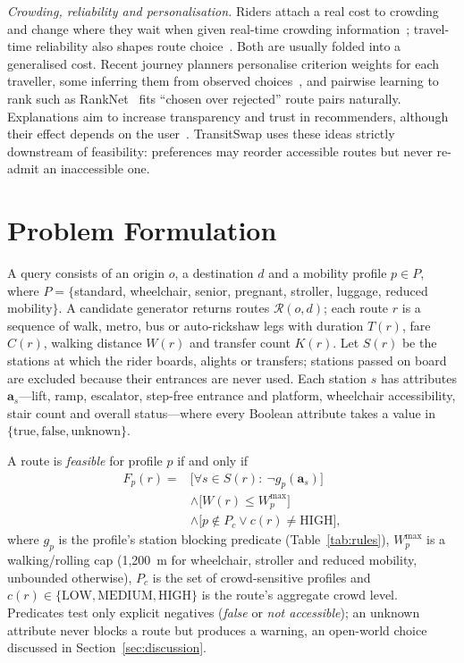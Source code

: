 \documentclass[conference]{IEEEtran}
\begin{document}
\textit{Crowding, reliability and personalisation.} Riders attach a real cost to crowding~\cite{fedujwar2024crowding} and change where they wait when given real-time crowding information~\cite{leprevost2026crowding}; travel-time reliability also shapes route choice~\cite{zhu2025reliability}. Both are usually folded into a generalised cost. Recent journey planners personalise criterion weights for each traveller, some inferring them from observed choices~\cite{bayliss2025maas,mandzuka2026preference}, and pairwise learning to rank such as RankNet~\cite{koppel2025ranknet} fits ``chosen over rejected'' route pairs naturally. Explanations aim to increase transparency and trust in recommenders, although their effect depends on the user~\cite{wardatzky2025explanations}. TransitSwap uses these ideas strictly downstream of feasibility: preferences may reorder accessible routes but never re-admit an inaccessible one.

\section{Problem Formulation}\label{sec:problem}

A query consists of an origin $o$, a destination $d$ and a mobility profile $p \in P$, where $P = \{$standard, wheelchair, senior, pregnant, stroller, luggage, reduced mobility$\}$. A candidate generator returns routes $\mathcal{R}(o,d)$; each route $r$ is a sequence of walk, metro, bus or auto-rickshaw legs with duration $T(r)$, fare $C(r)$, walking distance $W(r)$ and transfer count $K(r)$. Let $S(r)$ be the stations at which the rider boards, alights or transfers; stations passed on board are excluded because their entrances are never used. Each station $s$ has attributes $\mathbf{a}_s$---lift, ramp, escalator, step-free entrance and platform, wheelchair accessibility, stair count and overall status---where every Boolean attribute takes a value in $\{\mathrm{true}, \mathrm{false}, \mathrm{unknown}\}$.

A route is \emph{feasible} for profile $p$ if and only if
\begin{equation}
\begin{split}
F_p(r) = {} & \bigl[\forall s \in S(r){:}\ \neg g_p(\mathbf{a}_s)\bigr] \\
& \wedge \bigl[W(r) \le W^{\max}_{p}\bigr] \\
& \wedge \bigl[p \notin P_c \vee c(r) \ne \mathrm{HIGH}\bigr],
\end{split}
\label{eq:feasible}
\end{equation}
where $g_p$ is the profile's station blocking predicate (Table~\ref{tab:rules}), $W^{\max}_{p}$ is a walking/rolling cap (1,200~m for wheelchair, stroller and reduced mobility, unbounded otherwise), $P_c$ is the set of crowd-sensitive profiles and $c(r) \in \{\mathrm{LOW}, \mathrm{MEDIUM}, \mathrm{HIGH}\}$ is the route's aggregate crowd level. Predicates test only explicit negatives (\emph{false} or \emph{not accessible}); an unknown attribute never blocks a route but produces a warning, an open-world choice discussed in Section~\ref{sec:discussion}.
\end{document}
